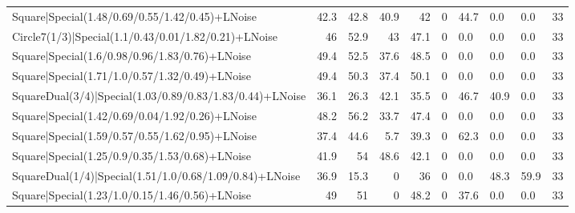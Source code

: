 \begin{tabular}{lrrrrrlllr}
 Square|Special(1.48/0.69/0.55/1.42/0.45)+LNoise                 &            42.3 &            42.8 &            40.9 &            42   &            0   & 44.7            & 0.0            & 0.0            &           33 \\
 Circle7(1/3)|Special(1.1/0.43/0.01/1.82/0.21)+LNoise            &            46   &            52.9 &            43   &            47.1 &            0   & 0.0             & 0.0            & 0.0            &           33 \\
 Square|Special(1.6/0.98/0.96/1.83/0.76)+LNoise                  &            49.4 &            52.5 &            37.6 &            48.5 &            0   & 0.0             & 0.0            & 0.0            &           33 \\
 Square|Special(1.71/1.0/0.57/1.32/0.49)+LNoise                  &            49.4 &            50.3 &            37.4 &            50.1 &            0   & 0.0             & 0.0            & 0.0            &           33 \\
 SquareDual(3/4)|Special(1.03/0.89/0.83/1.83/0.44)+LNoise        &            36.1 &            26.3 &            42.1 &            35.5 &            0   & 46.7            & 40.9           & 0.0            &           33 \\
 Square|Special(1.42/0.69/0.04/1.92/0.26)+LNoise                 &            48.2 &            56.2 &            33.7 &            47.4 &            0   & 0.0             & 0.0            & 0.0            &           33 \\
 Square|Special(1.59/0.57/0.55/1.62/0.95)+LNoise                 &            37.4 &            44.6 &             5.7 &            39.3 &            0   & 62.3            & 0.0            & 0.0            &           33 \\
 Square|Special(1.25/0.9/0.35/1.53/0.68)+LNoise                  &            41.9 &            54   &            48.6 &            42.1 &            0   & 0.0             & 0.0            & 0.0            &           33 \\
 SquareDual(1/4)|Special(1.51/1.0/0.68/1.09/0.84)+LNoise         &            36.9 &            15.3 &             0   &            36   &            0   & 0.0             & 48.3           & 59.9           &           33 \\
 Square|Special(1.23/1.0/0.15/1.46/0.56)+LNoise                  &            49   &            51   &             0   &            48.2 &            0   & 37.6            & 0.0            & 0.0            &           33 \\

\end{tabular}
